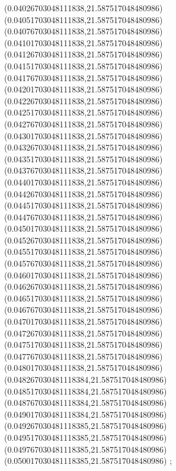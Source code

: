 {(0.04026703048111838,21.587517048480986)
(0.04051703048111838,21.587517048480986)
(0.04076703048111838,21.587517048480986)
(0.04101703048111838,21.587517048480986)
(0.04126703048111838,21.587517048480986)
(0.04151703048111838,21.587517048480986)
(0.04176703048111838,21.587517048480986)
(0.04201703048111838,21.587517048480986)
(0.04226703048111838,21.587517048480986)
(0.04251703048111838,21.587517048480986)
(0.04276703048111838,21.587517048480986)
(0.04301703048111838,21.587517048480986)
(0.04326703048111838,21.587517048480986)
(0.04351703048111838,21.587517048480986)
(0.04376703048111838,21.587517048480986)
(0.04401703048111838,21.587517048480986)
(0.04426703048111838,21.587517048480986)
(0.04451703048111838,21.587517048480986)
(0.04476703048111838,21.587517048480986)
(0.04501703048111838,21.587517048480986)
(0.04526703048111838,21.587517048480986)
(0.04551703048111838,21.587517048480986)
(0.04576703048111838,21.587517048480986)
(0.04601703048111838,21.587517048480986)
(0.04626703048111838,21.587517048480986)
(0.04651703048111838,21.587517048480986)
(0.04676703048111838,21.587517048480986)
(0.04701703048111838,21.587517048480986)
(0.04726703048111838,21.587517048480986)
(0.04751703048111838,21.587517048480986)
(0.04776703048111838,21.587517048480986)
(0.04801703048111838,21.587517048480986)
(0.048267030481118384,21.587517048480986)
(0.048517030481118384,21.587517048480986)
(0.048767030481118384,21.587517048480986)
(0.049017030481118384,21.587517048480986)
(0.049267030481118385,21.587517048480986)
(0.049517030481118385,21.587517048480986)
(0.049767030481118385,21.587517048480986)
(0.050017030481118385,21.587517048480986)
};
